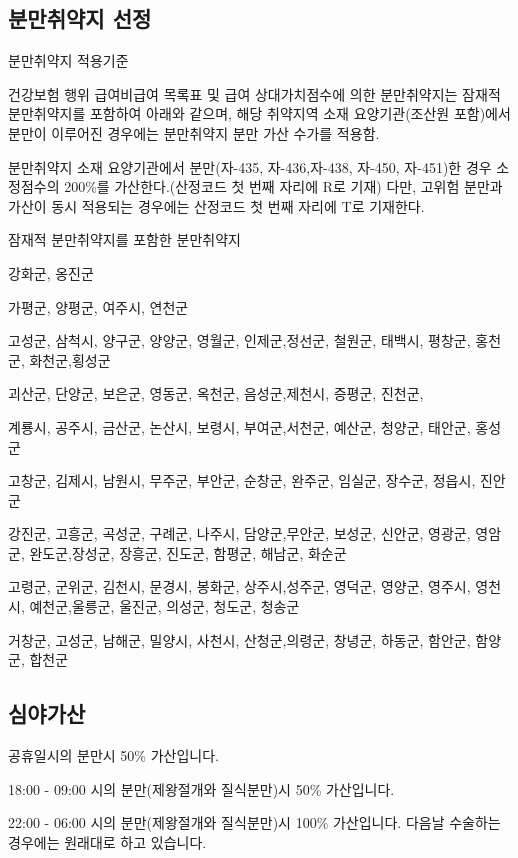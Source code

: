 \subsection{분만취약지 선정}
분만취약지 적용기준 \par
건강보험 행위 급여\bullet 비급여 목록표 및 급여 상대가치점수에 의한 분만취약지는 잠재적 분만취약지를 포함하여 아래와 같으며, 해당 취약지역 소재 요양기관(조산원 포함)에서 분만이 이루어진 경우에는 분만취약지 분만 가산 수가를 적용함. \par
분만취약지 소재 요양기관에서 분만(자-435, 자-436,자-438, 자-450, 자-451)한 경우 소정점수의 200\%를 가산한다.(산정코드 첫 번째 자리에 R로 기재) 다만, 고위험 분만과 가산이 동시 적용되는 경우에는 산정코드 첫 번째 자리에 T로 기재한다. 

\begin{commentbox}{잠재적 분만취약지를 포함한 분만취약지}
\begin{description}\tightlist
\item[인천] 강화군, 옹진군
\item[경기] 가평군, 양평군, 여주시, 연천군
\item[강원] 고성군, 삼척시, 양구군, 양양군, 영월군, 인제군,정선군, 철원군, 태백시, 평창군, 홍천군, 화천군,횡성군
\item[충북] 괴산군, 단양군, 보은군, 영동군, 옥천군, 음성군,제천시, 증평군, 진천군, 
\item[충남] 계룡시, 공주시, 금산군, 논산시, 보령시, 부여군,서천군, 예산군, 청양군, 태안군, 홍성군
\item[전북] 고창군, 김제시, 남원시, 무주군, 부안군, 순창군, 완주군, 임실군, 장수군, 정읍시, 진안군
\item[전남] 강진군, 고흥군, 곡성군, 구례군, 나주시, 담양군,무안군, 보성군, 신안군, 영광군, 영암군, 완도군,장성군, 장흥군, 진도군, 함평군, 해남군, 화순군
\item[경북] 고령군, 군위군, 김천시, 문경시, 봉화군, 상주시,성주군, 영덕군, 영양군, 영주시, 영천시, 예천군,울릉군, 울진군, 의성군, 청도군, 청송군
\item[경남] 거창군, 고성군, 남해군, 밀양시, 사천시, 산청군,의령군, 창녕군, 하동군, 함안군, 함양군, 합천군
\end{description}
\end{commentbox}
\prezi{\clearpage}
\subsection{심야가산}
공휴일시의 분만시 50\% 가산입니다.  \par
18:00 - 09:00 시의 분만(제왕절개와 질식분만)시 50\% 가산입니다. \par
22:00 - 06:00 시의 분만(제왕절개와 질식분만)시 100\% 가산입니다. %
다음날 수술하는 경우에는 원래대로 하고 있습니다. 
\prezi{\clearpage}
